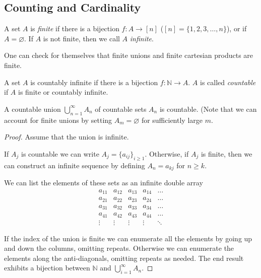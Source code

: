 \subsection{Counting and Cardinality}

\begin{definition}
A set $A$ is \textit{finite} if there is a bijection $f:A \to [n]$ ($[n] = \{1, 2, 3, \dotsc, n\}$), or if $A = \varnothing$.
If $A$ is not finite, then we call $A$ \textit{infinite}.
\end{definition}

One can check for themselves that finite unions and finite cartesian products are finite. 

\begin{definition}
A set $A$ is countably infinite if there is a bijection $f: \mathbb{N} \to A$. $A$ is called \textit{countable} if $A$ is finite or countably infinite.
\end{definition}

\begin{theorem}
A countable union $\bigcup_{n = 1}^{\infty}A_n$ of countable sets $A_n$ is countable. (Note that we can account for finite unions by setting $A_m = \varnothing$ for sufficiently large $m$.
\end{theorem}

\begin{proof}
Assume that the union is infinite.

If $A_j$ is countable we can write $A_j = \{a_{ij}\}_{i \geq 1}$. Otherwise, if $A_j$ is finite, then we can construct an infinite sequence by defining $A_n = a_{kj}$ for $n \geq k$.

We can list the elements of these sets as an infinite double array 
\[
\begin{matrix}
a_{11} & a_{12} & a_{13} & a_{14} & \dots \\
a_{21} & a_{22} & a_{23} & a_{24} & \dots \\
a_{31} & a_{32} & a_{33} & a_{34} & \dots \\
a_{41} & a_{42} & a_{43} & a_{44} & \dots \\
\vdots &\vdots &\vdots &\vdots & \ddots 
\end{matrix}
\]

If the index of the union is finite we can enumerate all the elements by going up and down the columns, omitting repeats. Otherwise we can enumerate the elements along the anti-diagonals, omitting repeats as needed. The end result exhibits a bijection between $\mathbb{N}$ and $\bigcup_{i = 1}^{\infty}A_n$.
\end{proof}

